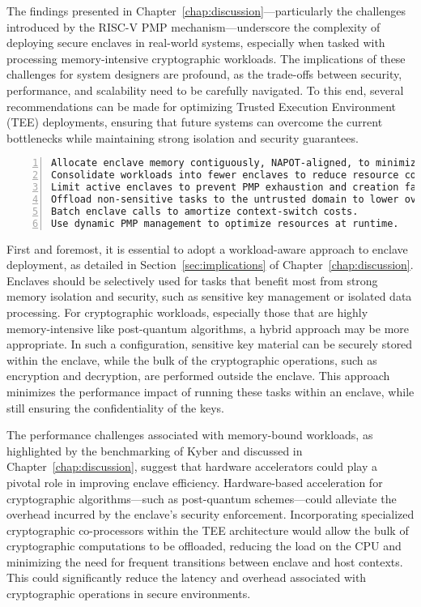 The findings presented in Chapter~\ref{chap:discussion}—particularly the challenges introduced by the RISC-V PMP mechanism—underscore the complexity of deploying secure enclaves in real-world systems, especially when tasked with processing memory-intensive cryptographic workloads. The implications of these challenges for system designers are profound, as the trade-offs between security, performance, and scalability need to be carefully navigated. To this end, several recommendations can be made for optimizing Trusted Execution Environment (TEE) deployments, ensuring that future systems can overcome the current bottlenecks while maintaining strong isolation and security guarantees.

\begin{lstlisting}[caption={Best Practices for RISC-V TEE Deployment}, 
                   label={lst:enclave-best-practices}, 
                   basicstyle=\ttfamily\small, 
                   numbers=left, 
                   numberstyle=\tiny, 
                   xleftmargin=2em]
Allocate enclave memory contiguously, NAPOT-aligned, to minimize PMP usage.
Consolidate workloads into fewer enclaves to reduce resource contention.
Limit active enclaves to prevent PMP exhaustion and creation failures.
Offload non-sensitive tasks to the untrusted domain to lower overhead.
Batch enclave calls to amortize context-switch costs.
Use dynamic PMP management to optimize resources at runtime.
\end{lstlisting}

First and foremost, it is essential to adopt a workload-aware approach to enclave deployment, as detailed in Section~\ref{sec:implications} of Chapter~\ref{chap:discussion}. Enclaves should be selectively used for tasks that benefit most from strong memory isolation and security, such as sensitive key management or isolated data processing. For cryptographic workloads, especially those that are highly memory-intensive like post-quantum algorithms, a hybrid approach may be more appropriate. In such a configuration, sensitive key material can be securely stored within the enclave, while the bulk of the cryptographic operations, such as encryption and decryption, are performed outside the enclave. This approach minimizes the performance impact of running these tasks within an enclave, while still ensuring the confidentiality of the keys.

The performance challenges associated with memory-bound workloads, as highlighted by the benchmarking of Kyber and discussed in Chapter~\ref{chap:discussion}, suggest that hardware accelerators could play a pivotal role in improving enclave efficiency. Hardware-based acceleration for cryptographic algorithms—such as post-quantum schemes—could alleviate the overhead incurred by the enclave’s security enforcement. Incorporating specialized cryptographic co-processors within the TEE architecture would allow the bulk of cryptographic computations to be offloaded, reducing the load on the CPU and minimizing the need for frequent transitions between enclave and host contexts. This could significantly reduce the latency and overhead associated with cryptographic operations in secure environments.

